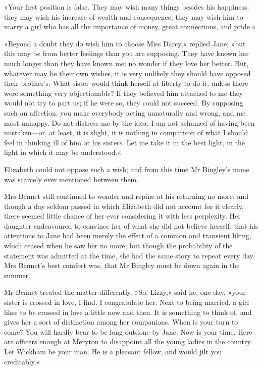 »Your first position is false. They may wish many things besides his happiness: they may wish his increase of wealth and consequence; they may wish him to marry a girl who has all the importance of money, great connections, and pride.«

»Beyond a doubt they do wish him to choose Miss Darcy,« replied Jane; »but this may be from better feelings than you are supposing. They have known her much longer than they have known me; no wonder if they love her better. But, whatever may be their own wishes, it is very unlikely they should have opposed their brother's. What sister would think herself at liberty to do it, unless there were something very objectionable? If they believed him attached to me they would not try to part us; if he were so, they could not succeed. By supposing such an affection, you make everybody acting unnaturally and wrong, and me most unhappy. Do not distress me by the idea. I am not ashamed of having been mistaken—or, at least, it is slight, it is nothing in comparison of what I should feel in thinking ill of him or his sisters. Let me take it in the best light, in the light in which it may be understood.«

Elizabeth could not oppose such a wish; and from this time Mr Bingley's name was scarcely ever mentioned between them.

Mrs Bennet still continued to wonder and repine at his returning no more; and though a day seldom passed in which Elizabeth did not account for it clearly, there seemed little chance of her ever considering it with less perplexity. Her daughter endeavoured to convince her of what she did not believe herself, that his attentions to Jane had been merely the effect of a common and transient liking, which ceased when he saw her no more; but though the probability of the statement was admitted at the time, she had the same story to repeat every day. Mrs Bennet's best comfort was, that Mr Bingley must be down again in the summer.

Mr Bennet treated the matter differently. »So, Lizzy,« said he, one day, »your sister is crossed in love, I find. I congratulate her. Next to being married, a girl likes to be crossed in love a little now and then. It is something to think of, and gives her a sort of distinction among her companions. When is your turn to come? You will hardly bear to be long outdone by Jane. Now is your time. Here are officers enough at Meryton to disappoint all the young ladies in the country. Let Wickham be your man. He is a pleasant fellow, and would jilt you creditably.«

